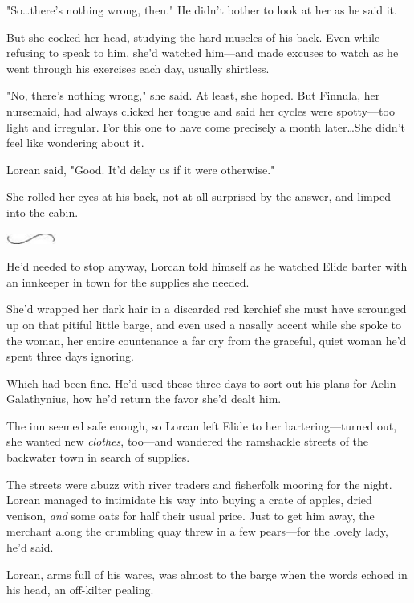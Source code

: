 "So\ldots there's nothing wrong, then."
He didn't bother to look at her as he said it.

But she cocked her head, studying the hard muscles of his back.
Even while refusing to speak to him, she'd watched him---and made excuses to watch as he went through his exercises each day, usually shirtless.

"No, there's nothing wrong," she said.
At least, she hoped.
But Finnula, her nursemaid, had always clicked her tongue and said her cycles were spotty---too light and irregular.
For this one to have come precisely a month later\ldots She didn't feel like wondering about it.

Lorcan said, "Good.
It'd delay us if it were otherwise."

She rolled her eyes at his back, not at all surprised by the answer, and limped into the cabin.

\begin{center}
	\includegraphics[width=0.65in,height=0.13in]{images/seperator}
\end{center}

He'd needed to stop anyway, Lorcan told himself as he watched Elide barter with an innkeeper in town for the supplies she needed.

She'd wrapped her dark hair in a discarded red kerchief she must have scrounged up on that pitiful little barge, and even used a nasally accent while she spoke to the woman, her entire countenance a far cry from the graceful, quiet woman he'd spent three days ignoring.

Which had been fine.
He'd used these three days to sort out his plans for Aelin Galathynius, how he'd return the favor she'd dealt him.

The inn seemed safe enough, so Lorcan left Elide to her bartering---turned out, she wanted new \emph{clothes}, too---and wandered the ramshackle streets of the backwater town in search of supplies.

The streets were abuzz with river traders and fisherfolk mooring for the night.
Lorcan managed to intimidate his way into buying a crate of apples, dried venison, \emph{and} some oats for half their usual price.
Just to get him away, the merchant along the crumbling quay threw in a few pears---for the lovely lady, he'd said.

Lorcan, arms full of his wares, was almost to the barge when the words echoed in his head, an off-kilter pealing.

